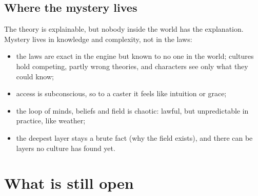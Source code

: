 \documentclass[11pt,a4paper]{article}
\begin{document}
\subsection{Where the mystery lives}

The theory is explainable, but nobody inside the world has the explanation. Mystery lives in knowledge and complexity, not in the laws:
\begin{itemize}
  \item the laws are exact in the engine but known to no one in the world; cultures hold competing, partly wrong theories, and characters see only what they could know;
  \item access is subconscious, so to a caster it feels like intuition or grace;
  \item the loop of minds, beliefs and field is chaotic: lawful, but unpredictable in practice, like weather;
  \item the deepest layer stays a brute fact (why the field exists), and there can be layers no culture has found yet.
\end{itemize}

\section{What is still open}\label{sec:open}
\end{document}
